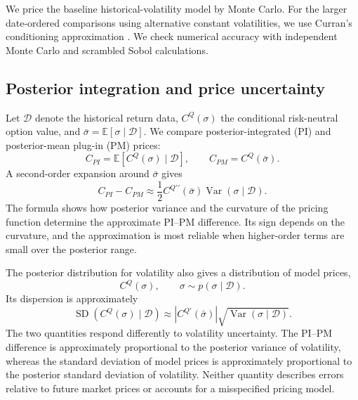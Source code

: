 We price the baseline historical-volatility model by Monte Carlo. For the larger date-ordered comparisons using alternative constant volatilities, we use Curran's conditioning approximation \citep{curran1994}. We check numerical accuracy with independent Monte Carlo and scrambled Sobol calculations.

\subsection{Posterior integration and price uncertainty}

Let \(\mathcal D\) denote the historical return data, \(C^Q(\sigma)\) the conditional risk-neutral option value, and \(\bar\sigma=\mathbb E[\sigma\mid\mathcal D]\). We compare posterior-integrated (PI) and posterior-mean plug-in (PM) prices:
\begin{equation}
 C_{PI}=\mathbb E[C^Q(\sigma)\mid\mathcal D],
 \qquad
 C_{PM}=C^Q(\bar\sigma).
 \label{eq:short_pi_pm}
\end{equation}
A second-order expansion around \(\bar\sigma\) gives
\begin{equation}
 C_{PI}-C_{PM}
 \approx
 \frac12 C^{Q\prime\prime}(\bar\sigma)
 \operatorname{Var}(\sigma\mid\mathcal D).
 \label{eq:short_taylor}
\end{equation}
The formula shows how posterior variance and the curvature of the pricing function determine the approximate PI--PM difference. Its sign depends on the curvature, and the approximation is most reliable when higher-order terms are small over the posterior range.

The posterior distribution for volatility also gives a distribution of model prices,
\begin{equation}
 C^Q(\sigma),\qquad \sigma\sim p(\sigma\mid\mathcal D).
 \label{eq:short_pushforward}
\end{equation}
Its dispersion is approximately
\begin{equation}
 \operatorname{SD}\!\left(C^Q(\sigma)\mid\mathcal D\right)
 \approx
 \left|C^{Q\prime}(\bar\sigma)\right|
 \sqrt{\operatorname{Var}(\sigma\mid\mathcal D)}.
 \label{eq:short_delta}
\end{equation}
The two quantities respond differently to volatility uncertainty. The PI--PM difference is approximately proportional to the posterior variance of volatility, whereas the standard deviation of model prices is approximately proportional to the posterior standard deviation of volatility. Neither quantity describes errors relative to future market prices or accounts for a misspecified pricing model.

